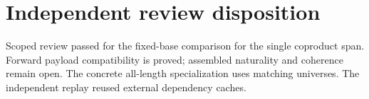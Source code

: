 \section*{Independent review disposition}
Scoped review passed for the fixed-base comparison for the single coproduct span. Forward payload compatibility is proved; assembled naturality and coherence remain open. The concrete all-length specialization uses matching universes. The independent replay reused external dependency caches.
